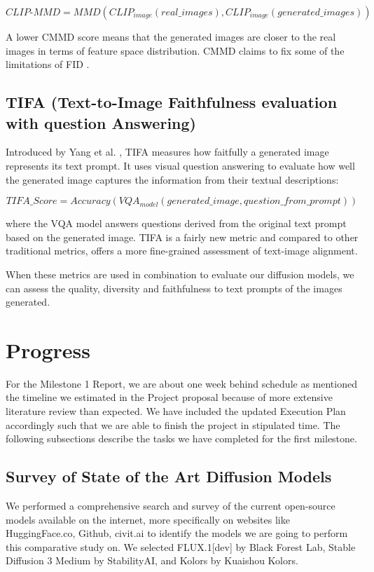 \documentclass{article}
\begin{document}
\begin{equation}
    CLIP\text{-}MMD = MMD(CLIP_{image}(real\_images), CLIP_{image}(generated\_images))
\end{equation}

A lower CMMD score means that the generated images are closer to the real images in terms of feature space distribution. CMMD claims to 
fix some of the limitations of FID \cite{rethinkingFID2024}.

\subsection{TIFA (Text-to-Image Faithfulness evaluation with question Answering)}

Introduced by Yang et al. \cite{yang2022empirical}, TIFA measures how faitfully a generated image represents its text prompt.
It uses visual question answering to evaluate how well the generated image captures the information from their textual descriptions:

\begin{equation}
    TIFA\_Score = Accuracy(VQA_{model}(generated\_image, question\_from\_prompt))
\end{equation}

where the VQA model answers questions derived from the original text prompt based on the generated image. 
TIFA is a fairly new metric and compared to other traditional metrics, offers a more fine-grained assessment of text-image alignment.

When these metrics are used in combination to evaluate our diffusion models, we can assess the quality, diversity and faithfulness
to text prompts of the images generated.


\section{Progress}
For the Milestone 1 Report, we are about one week behind schedule as mentioned the timeline we estimated in the Project proposal because of more extensive literature review than expected. We have included the updated Execution Plan accordingly such that we are able to finish the project in stipulated time. The following subsections describe the tasks we have completed for the first milestone.

\subsection{Survey of State of the Art Diffusion Models}
We performed a comprehensive search and survey of the current open-source models available on the internet, more specifically on websites like HuggingFace.co, Github, civit.ai to identify the models we are going to perform this comparative study on. We selected FLUX.1[dev] by Black Forest Lab, Stable Diffusion 3 Medium by StabilityAI, and Kolors by Kuaishou Kolors.
\end{document}
